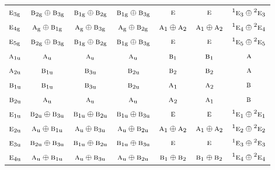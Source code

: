 \documentclass[10pt,a4paper]{article}
\numberwithin{equation}{section}
\newcommand{\irr}[1]{\text{\normalfont\scshape #1}}
\newcommand{\conjpair}[1]{{}^{#1}}
\newcommand{\ptag}[1]{\mathrm{#1}}
\begin{document}
{\begin{longtable}{@{}lcccccc@{}}
$\irr{e}_{3\ptag{g}}$ & $\irr{b}_{2\ptag{g}}\oplus \irr{b}_{3\ptag{g}}$ & $\irr{b}_{1\ptag{g}}\oplus \irr{b}_{2\ptag{g}}$ & $\irr{b}_{1\ptag{g}}\oplus \irr{b}_{3\ptag{g}}$ & $\irr{e}$ & $\irr{e}$ & $\conjpair{1}\irr{e}_{3}\oplus \conjpair{2}\irr{e}_{3}$\\
$\irr{e}_{4\ptag{g}}$ & $\irr{a}_{\ptag{g}}\oplus \irr{b}_{1\ptag{g}}$ & $\irr{a}_{\ptag{g}}\oplus \irr{b}_{3\ptag{g}}$ & $\irr{a}_{\ptag{g}}\oplus \irr{b}_{2\ptag{g}}$ & $\irr{a}_{1}\oplus \irr{a}_{2}$ & $\irr{a}_{1}\oplus \irr{a}_{2}$ & $\conjpair{1}\irr{e}_{4}\oplus \conjpair{2}\irr{e}_{4}$\\
$\irr{e}_{5\ptag{g}}$ & $\irr{b}_{2\ptag{g}}\oplus \irr{b}_{3\ptag{g}}$ & $\irr{b}_{1\ptag{g}}\oplus \irr{b}_{2\ptag{g}}$ & $\irr{b}_{1\ptag{g}}\oplus \irr{b}_{3\ptag{g}}$ & $\irr{e}$ & $\irr{e}$ & $\conjpair{1}\irr{e}_{5}\oplus \conjpair{2}\irr{e}_{5}$\\
$\irr{a}_{1\ptag{u}}$ & $\irr{a}_{\ptag{u}}$ & $\irr{a}_{\ptag{u}}$ & $\irr{a}_{\ptag{u}}$ & $\irr{b}_{1}$ & $\irr{b}_{1}$ & $\irr{a}$\\
$\irr{a}_{2\ptag{u}}$ & $\irr{b}_{1\ptag{u}}$ & $\irr{b}_{3\ptag{u}}$ & $\irr{b}_{2\ptag{u}}$ & $\irr{b}_{2}$ & $\irr{b}_{2}$ & $\irr{a}$\\
$\irr{b}_{1\ptag{u}}$ & $\irr{b}_{1\ptag{u}}$ & $\irr{b}_{3\ptag{u}}$ & $\irr{b}_{2\ptag{u}}$ & $\irr{a}_{1}$ & $\irr{a}_{2}$ & $\irr{b}$\\
$\irr{b}_{2\ptag{u}}$ & $\irr{a}_{\ptag{u}}$ & $\irr{a}_{\ptag{u}}$ & $\irr{a}_{\ptag{u}}$ & $\irr{a}_{2}$ & $\irr{a}_{1}$ & $\irr{b}$\\
$\irr{e}_{1\ptag{u}}$ & $\irr{b}_{2\ptag{u}}\oplus \irr{b}_{3\ptag{u}}$ & $\irr{b}_{1\ptag{u}}\oplus \irr{b}_{2\ptag{u}}$ & $\irr{b}_{1\ptag{u}}\oplus \irr{b}_{3\ptag{u}}$ & $\irr{e}$ & $\irr{e}$ & $\conjpair{1}\irr{e}_{1}\oplus \conjpair{2}\irr{e}_{1}$\\
$\irr{e}_{2\ptag{u}}$ & $\irr{a}_{\ptag{u}}\oplus \irr{b}_{1\ptag{u}}$ & $\irr{a}_{\ptag{u}}\oplus \irr{b}_{3\ptag{u}}$ & $\irr{a}_{\ptag{u}}\oplus \irr{b}_{2\ptag{u}}$ & $\irr{a}_{1}\oplus \irr{a}_{2}$ & $\irr{a}_{1}\oplus \irr{a}_{2}$ & $\conjpair{1}\irr{e}_{2}\oplus \conjpair{2}\irr{e}_{2}$\\
$\irr{e}_{3\ptag{u}}$ & $\irr{b}_{2\ptag{u}}\oplus \irr{b}_{3\ptag{u}}$ & $\irr{b}_{1\ptag{u}}\oplus \irr{b}_{2\ptag{u}}$ & $\irr{b}_{1\ptag{u}}\oplus \irr{b}_{3\ptag{u}}$ & $\irr{e}$ & $\irr{e}$ & $\conjpair{1}\irr{e}_{3}\oplus \conjpair{2}\irr{e}_{3}$\\
$\irr{e}_{4\ptag{u}}$ & $\irr{a}_{\ptag{u}}\oplus \irr{b}_{1\ptag{u}}$ & $\irr{a}_{\ptag{u}}\oplus \irr{b}_{3\ptag{u}}$ & $\irr{a}_{\ptag{u}}\oplus \irr{b}_{2\ptag{u}}$ & $\irr{b}_{1}\oplus \irr{b}_{2}$ & $\irr{b}_{1}\oplus \irr{b}_{2}$ & $\conjpair{1}\irr{e}_{4}\oplus \conjpair{2}\irr{e}_{4}$\\

\end{longtable}}
\end{document}
